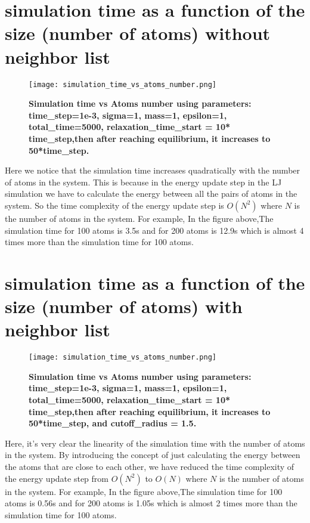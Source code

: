 \section{simulation time as a function of the size (number of atoms) without neighbor list}
\graphicspath{ {./figures/milestone05/} }
\begin{figure}[!htb]
\centering
    \texttt{[image: simulation\_time\_vs\_atoms\_number.png]}
    \caption[Simulation time vs Atoms number]{\textbf{Simulation time vs Atoms number using parameters: time\_step=1e-3, sigma=1, mass=1, epsilon=1, total\_time=5000, relaxation\_time\_start = 10* time\_step,then after reaching equilibrium, it increases to 50*time\_step.}}
\label{fig:simulation_time_vs_atoms_number}
\end{figure}
Here we notice that the simulation time increases quadratically with the number of atoms in the system. This is because in the energy update step in the LJ simulation we have to calculate the energy between all the pairs of atoms in the system. So the time complexity of the energy update step is $O(N^2)$ where $N$ is the number of atoms in the system. For example, In the figure above,The  simulation time for 100 atoms is 3.5s and for 200 atoms is 12.9s which is almost 4 times more than the simulation time for 100 atoms.

\section{simulation time as a function of the size (number of atoms) with neighbor list}
\graphicspath{ {./figures/milestone06/} }
\begin{figure}[!htb]
\centering
    \texttt{[image: simulation\_time\_vs\_atoms\_number.png]}
    \caption[Simulation time vs Atoms number]{\textbf{Simulation time vs Atoms number using parameters: time\_step=1e-3, sigma=1, mass=1, epsilon=1, total\_time=5000, relaxation\_time\_start = 10* time\_step,then after reaching equilibrium, it increases to 50*time\_step, and cutoff\_radius = 1.5.}}
\label{fig:simulation_time_vs_atoms_number}
\end{figure}
Here, it's very clear the linearity of the simulation time with the number of atoms in the system. By introducing the concept of just calculating the energy between the atoms that are close to each other, we have reduced the time complexity of the energy update step from $O(N^2)$ to $O(N)$ where $N$ is the number of atoms in the system. For example, In the figure above,The  simulation time for 100 atoms is 0.56s and for 200 atoms is 1.05s which is almost 2 times more than the simulation time for 100 atoms.

